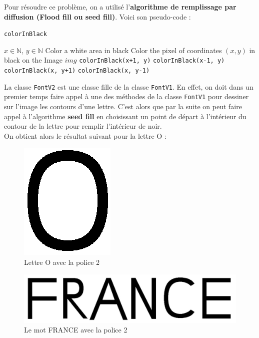 \documentclass[a4paper, 12pt]{article}
\begin{document}
	Pour résoudre ce problème, on a utilisé l'\textbf{algorithme de remplissage par diffusion (Flood fill ou seed fill)}. Voici son pseudo-code :
 
\begin{algorithm}
	\caption{\texttt{colorInBlack}}
		\begin{algorithmic}[1]
		\Require $x \in \mathbb{N}$, $y \in \mathbb{N}$
		\Ensure Color a white area in black
			\State \Return
		\EndIf
			\State Color the pixel of coordinates $(x, y)$ in black on the Image $img$
			\State \texttt{colorInBlack(x+1, y)} 
			\State \texttt{colorInBlack(x-1, y)} 
			\State \texttt{colorInBlack(x, y+1)} 
			\State \texttt{colorInBlack(x, y-1)} 
		\EndIf	
		\EndFunction
		\end{algorithmic}
\end{algorithm}
\newpage
La classe \texttt{FontV2} est une classe fille de la classe \texttt{FontV1}. En effet, on doit dans un premier temps faire appel à une des méthodes de la classe \texttt{FontV1} pour dessiner sur l'image les contours d'une lettre. C'est alors que par la suite on peut faire appel à l'algorithme \textbf{seed fill} en choisissant un point de départ à l'intérieur du contour de la lettre pour remplir l'intérieur de noir.\\

On obtient alors le résultat suivant pour la lettre O : 

\begin{figure}[h]
\centering
\includegraphics[scale=0.9]{Images/FontV2_O.png}
\caption{Lettre O avec la police 2}
\label{fig4}
\end{figure}

\begin{figure}[h]
\centering
\includegraphics[scale=0.5]{Images/FRANCE_FontV2.jpeg}
\caption{Le mot FRANCE avec la police 2}
\label{fig5}
\end{figure}
\end{document}
